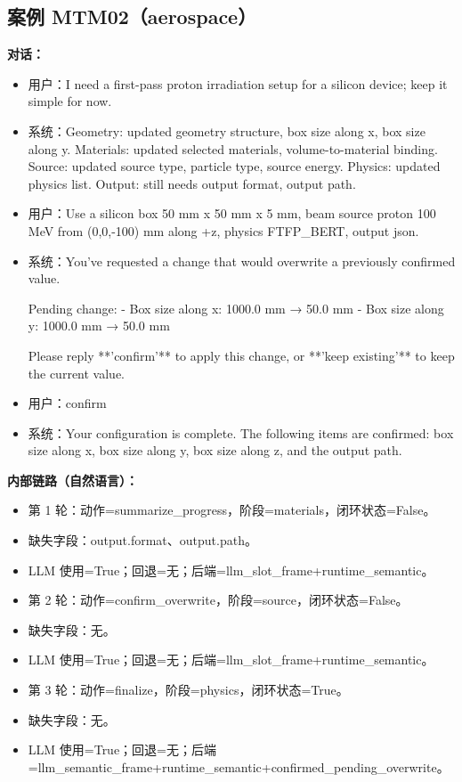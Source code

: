 \documentclass[11pt]{ctexart}
\begin{document}
\subsection{案例 MTM02（aerospace）}
\textbf{对话：}
\begin{itemize}
\item 用户：I need a first-pass proton irradiation setup for a silicon device; keep it simple for now.
\item 系统：Geometry: updated geometry structure, box size along x, box size along y. Materials: updated selected materials, volume-to-material binding. Source: updated source type, particle type, source energy. Physics: updated physics list. Output: still needs output format, output path.
\item 用户：Use a silicon box 50 mm x 50 mm x 5 mm, beam source proton 100 MeV from (0,0,-100) mm along +z, physics FTFP\_BERT, output json.
\item 系统：You've requested a change that would overwrite a previously confirmed value.

Pending change:
- Box size along x: 1000.0 mm → 50.0 mm
- Box size along y: 1000.0 mm → 50.0 mm

Please reply **'confirm'** to apply this change, or **'keep existing'** to keep the current value.
\item 用户：confirm
\item 系统：Your configuration is complete. The following items are confirmed: box size along x, box size along y, box size along z, and the output path.
\end{itemize}
\textbf{内部链路（自然语言）：}
\begin{itemize}
\item 第 1 轮：动作=summarize\_progress，阶段=materials，闭环状态=False。
\item 缺失字段：output.format、output.path。
\item LLM 使用=True；回退=无；后端=llm\_slot\_frame+runtime\_semantic。
\item 第 2 轮：动作=confirm\_overwrite，阶段=source，闭环状态=False。
\item 缺失字段：无。
\item LLM 使用=True；回退=无；后端=llm\_slot\_frame+runtime\_semantic。
\item 第 3 轮：动作=finalize，阶段=physics，闭环状态=True。
\item 缺失字段：无。
\item LLM 使用=True；回退=无；后端=llm\_semantic\_frame+runtime\_semantic+confirmed\_pending\_overwrite。
\end{itemize}
\end{document}
